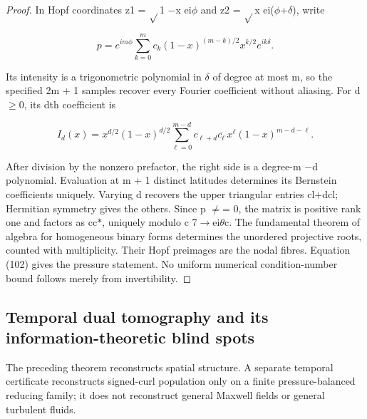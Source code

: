 \documentclass[10pt,letterpaper]{article}
\theoremstyle{remark}
\begin{document}
\begin{proof}
In Hopf coordinates z1 = \(\sqrt{} \)1 \(- \)x ei\(\phi \) and z2 = \(\sqrt{} \)x ei(\(\phi \)+\(\delta \)), write


\begin{equation}
\tag{103}\label{eq:103}
p=e^{im\phi}\sum_{k=0}^mc_k(1-x)^{(m-k)/2}x^{k/2}e^{ik\delta}.
\end{equation}

Its intensity is a trigonometric polynomial in \(\delta \) of degree at most m, so the specified 2m + 1 samples recover every Fourier coefficient without aliasing. For d \(\ge \)0, its dth coefficient is



\begin{equation}
\tag{104}\label{eq:104}
\widehat I_d(x)=x^{d/2}(1-x)^{d/2}\sum_{\ell=0}^{m-d}c_{\ell+d}\overline{c_\ell}\,x^\ell(1-x)^{m-d-\ell}.
\end{equation}

After division by the nonzero prefactor, the right side is a degree-m \(- \)d polynomial. Evaluation at m + 1 distinct latitudes determines its Bernstein coefficients uniquely. Varying d recovers the upper triangular entries cl+dcl; Hermitian symmetry gives the others. Since p \(\ne \)= 0, the matrix is positive rank one and factors as cc\(\ast \), uniquely modulo c 7\(\to \)ei\(\theta \)c. The fundamental theorem of algebra for homogeneous binary forms determines the unordered projective roots, counted with multiplicity. Their Hopf preimages are the nodal fibres. Equation (102) gives the pressure statement. No uniform numerical condition-number bound follows merely from invertibility.


\end{proof}

\subsection{Temporal dual tomography and its information-theoretic blind spots}

The preceding theorem reconstructs spatial structure. A separate temporal certificate reconstructs signed-curl population only on a finite pressure-balanced reducing family; it does not reconstruct general Maxwell fields or general turbulent fluids.
\end{document}
